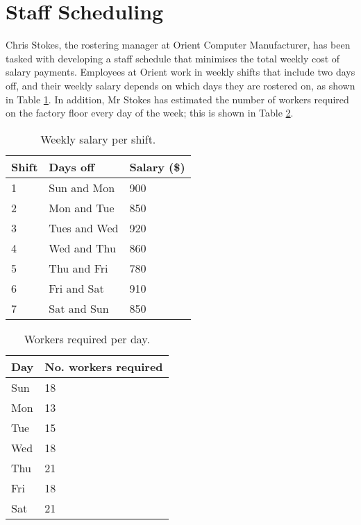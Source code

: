 \documentclass[11pt, a4paper]{article}
\begin{document}
    \newpage

    \section{Staff Scheduling}

    Chris Stokes, the rostering manager at Orient Computer Manufacturer, has been tasked with developing a staff schedule that minimises the total weekly cost of salary payments. Employees at Orient work in weekly shifts that include two days off, and their weekly salary depends on which days they are rostered on, as shown in Table \ref{shifts}. In addition, Mr Stokes has estimated the number of workers required on the factory floor every day of the week; this is shown in Table \ref{workers_needed}. 

    \begin{table}[!ht]
        \centering
        \caption{Weekly salary per shift.}
        \begin{tabular}{|l|l|l|}
            \hline
            Shift   & Days off      & Salary (\$)  \\ \hline
            1       & Sun and Mon   & 900          \\ \hline
            2       & Mon and Tue   & 850          \\ \hline
            3       & Tues and Wed  & 920          \\ \hline
            4       & Wed and Thu   & 860          \\ \hline
            5       & Thu and Fri   & 780          \\ \hline
            6       & Fri and Sat   & 910          \\ \hline
            7       & Sat and Sun   & 850          \\ \hline
        \end{tabular}
        \label{shifts}
    \end{table}

    \begin{table}[!ht]
        \centering
        \caption{Workers required per day.}
        \begin{tabular}{|l|l|}
            \hline
            Day     & No. workers required  \\ \hline
            Sun     & 18                    \\ \hline
            Mon     & 13                    \\ \hline
            Tue     & 15                    \\ \hline
            Wed     & 18                    \\ \hline
            Thu     & 21                    \\ \hline
            Fri     & 18                    \\ \hline
            Sat     & 21                    \\ \hline     
        \end{tabular}
        \label{workers_needed}
    \end{table}
\end{document}
